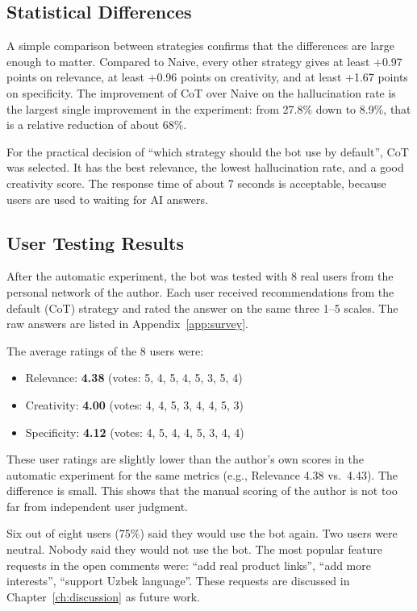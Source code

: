 \subsection{Statistical Differences}

A simple comparison between strategies confirms that the differences are large enough to matter. Compared to Naive, every other strategy gives at least +0.97 points on relevance, at least +0.96 points on creativity, and at least +1.67 points on specificity. The improvement of CoT over Naive on the hallucination rate is the largest single improvement in the experiment: from 27.8\% down to 8.9\%, that is a relative reduction of about 68\%.

For the practical decision of ``which strategy should the bot use by default'', CoT was selected. It has the best relevance, the lowest hallucination rate, and a good creativity score. The response time of about 7 seconds is acceptable, because users are used to waiting for AI answers.

\subsection{User Testing Results}

After the automatic experiment, the bot was tested with 8 real users from the personal network of the author. Each user received recommendations from the default (CoT) strategy and rated the answer on the same three 1--5 scales. The raw answers are listed in Appendix~\ref{app:survey}.

The average ratings of the 8 users were:
\begin{itemize}
    \item Relevance: \textbf{4.38} (votes: 5, 4, 5, 4, 5, 3, 5, 4)
    \item Creativity: \textbf{4.00} (votes: 4, 4, 5, 3, 4, 4, 5, 3)
    \item Specificity: \textbf{4.12} (votes: 4, 5, 4, 4, 5, 3, 4, 4)
\end{itemize}

These user ratings are slightly lower than the author's own scores in the automatic experiment for the same metrics (e.g., Relevance 4.38 vs.\ 4.43). The difference is small. This shows that the manual scoring of the author is not too far from independent user judgment.

Six out of eight users (75\%) said they would use the bot again. Two users were neutral. Nobody said they would not use the bot. The most popular feature requests in the open comments were: ``add real product links'', ``add more interests'', ``support Uzbek language''. These requests are discussed in Chapter~\ref{ch:discussion} as future work.

